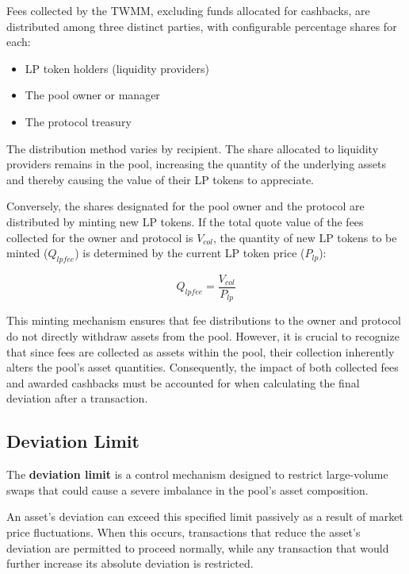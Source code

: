 Fees collected by the TWMM, excluding funds allocated for cashbacks, are distributed among three distinct parties, with configurable percentage shares for each:
\begin{itemize}
	\item LP token holders (liquidity providers)
	\item The pool owner or manager
	\item The protocol treasury
\end{itemize}

The distribution method varies by recipient. The share allocated to liquidity providers remains in the pool, increasing the quantity of the underlying assets and thereby causing the value of their LP tokens to appreciate.

Conversely, the shares designated for the pool owner and the protocol are distributed by minting new LP tokens. If the total quote value of the fees collected for the owner and protocol is $V_{col}$, the quantity of new LP tokens to be minted ($Q_{lpfee}$) is determined by the current LP token price ($P_{lp}$):

\begin{equation}
	\label{eq:fee_minting}
	Q_{lpfee} = \frac{V_{col}}{P_{lp}}
\end{equation}

This minting mechanism ensures that fee distributions to the owner and protocol do not directly withdraw assets from the pool. However, it is crucial to recognize that since fees are collected as assets within the pool, their collection inherently alters the pool's asset quantities. Consequently, the impact of both collected fees and awarded cashbacks must be accounted for when calculating the final deviation after a transaction.


\subsection{Deviation Limit}

The \textbf{deviation limit} is a control mechanism designed to restrict large-volume swaps that could cause a severe imbalance in the pool's asset composition.

An asset's deviation can exceed this specified limit passively as a result of market price fluctuations. When this occurs, transactions that reduce the asset's deviation are permitted to proceed normally, while any transaction that would further increase its absolute deviation is restricted.

